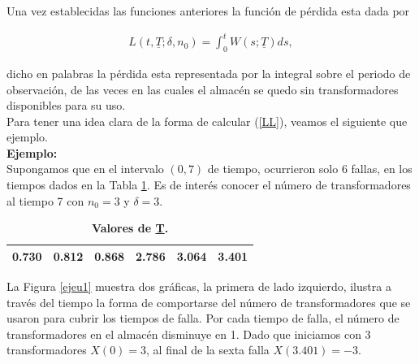 \noindent Una vez establecidas las funciones anteriores la funci\'on de p\'erdida esta dada por 

\begin{eqnarray}\label{LL}
L(t,\underline{T};\delta, n_0)=\int_{0}^{t} W(s;\underline{T}) ds,
\end{eqnarray}

\noindent dicho en palabras la p\'erdida esta representada por la integral sobre el periodo de observaci\'on, de las veces en las cuales el almac\'en se quedo sin transformadores disponibles para su uso.\\[0.1cm]
Para tener una idea clara de la forma de calcular (\ref{LL}), veamos el siguiente que ejemplo.\\[0.1cm]


{\bf \noindent  Ejemplo:} 
\\[0.1cm]
Supongamos que en el intervalo $(0,7)$ de tiempo, ocurrieron solo 6 fallas, en los tiempos dados en la Tabla \ref{4500}. Es de inter\'es  conocer el n\'umero de transformadores al tiempo 7 con $n_0=3$ y $\delta=3$.
\begin{table}[h!]\small
\caption{\bf Valores de \underline{T}.\label{4500}}
\centering
\vspace{0.3cm }\begin{tabular}{cccccc}
\toprule[0.6mm]
0.730 & 0.812 & 0.868 &  2.786 &  3.064 &  3.401  \\
\toprule[0.6mm]
\end{tabular}
\end{table}


\noindent La Figura \ref{ejeu1} muestra dos gr\'aficas, la primera de lado izquierdo, ilustra a trav\'es del tiempo la forma de comportarse del n\'umero de  transformadores que se usaron para cubrir los tiempos de falla. Por cada tiempo de falla, el n\'umero de transformadores en el almac\'en disminuye en 1. Dado que iniciamos con 3 transformadores $X(0)=3$, al final de la sexta  falla $X(3.401)=-3$. 




